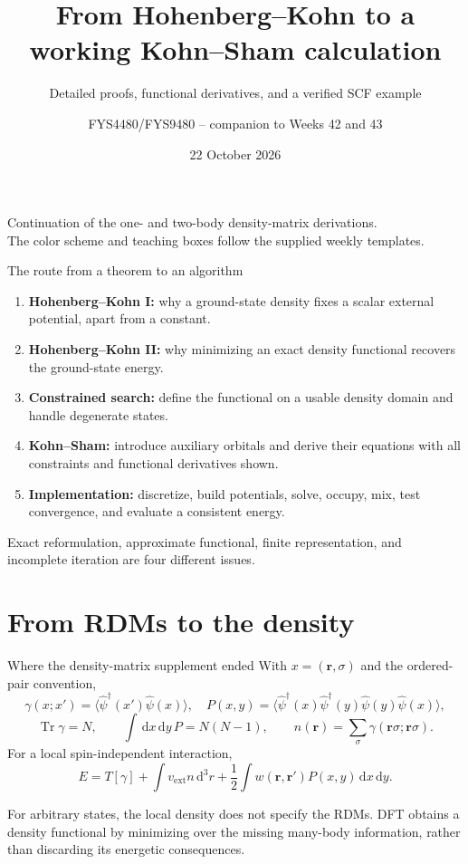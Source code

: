 \documentclass[aspectratio=169,10pt]{beamer}
\title{From Hohenberg--Kohn to a working Kohn--Sham calculation}
\subtitle{Detailed proofs, functional derivatives, and a verified SCF example}
\author{FYS4480/FYS9480 -- companion to Weeks 42 and 43}
\institute{Quantum mechanics for many-particle systems\\University of Oslo}
\date{22 October 2026}
\newcommand{\mbbox}[1]{\begin{tcolorbox}[colback=paleblue,colframe=uioblue,title={Many-body connection}]#1\end{tcolorbox}}
\newcommand{\dftbox}[1]{\begin{tcolorbox}[colback=paleteal,colframe=teal,title={Key result}]#1\end{tcolorbox}}
\newcommand{\dd}{\,\mathrm d}
\newcommand{\rr}{\mathbf r}
\newcommand{\avg}[1]{\langle #1\rangle}
\newcommand{\Tr}{\operatorname{Tr}}
\newcommand{\ext}{\mathrm{ext}}
\begin{document}
\begin{frame}[plain]
\titlepage
\begin{center}\small
Continuation of the one- and two-body density-matrix derivations.\\
The color scheme and teaching boxes follow the supplied weekly templates.
\end{center}
\end{frame}

\begin{frame}{The route from a theorem to an algorithm}
\begin{enumerate}
\item \textbf{Hohenberg--Kohn I:} why a ground-state density fixes a scalar
external potential, apart from a constant.
\item \textbf{Hohenberg--Kohn II:} why minimizing an exact density functional
recovers the ground-state energy.
\item \textbf{Constrained search:} define the functional on a usable density
domain and handle degenerate states.
\item \textbf{Kohn--Sham:} introduce auxiliary orbitals and derive their equations
with all constraints and functional derivatives shown.
\item \textbf{Implementation:} discretize, build potentials, solve, occupy,
mix, test convergence, and evaluate a consistent energy.
\end{enumerate}
\dftbox{Exact reformulation, approximate functional, finite representation,
and incomplete iteration are four different issues.}
\end{frame}

\section{From RDMs to the density}
\begin{frame}{Where the density-matrix supplement ended}
With $x=(\rr,\sigma)$ and the ordered-pair convention,
\[
 \gamma(x;x')=\avg{\hat\psi^\dagger(x')\hat\psi(x)},\quad
 P(x,y)=\avg{\hat\psi^\dagger(x)\hat\psi^\dagger(y)\hat\psi(y)\hat\psi(x)},
\]
\[
 \Tr\gamma=N,\qquad \int\dd x\dd y\,P=N(N-1),\qquad
 n(\rr)=\sum_\sigma\gamma(\rr\sigma;\rr\sigma).
\]
For a local spin-independent interaction,
\[
 E=T[\gamma]+\int v_{\ext}n\dd^3r
                         +\frac12\int w(\rr,\rr')P(x,y)\dd x\dd y.
\]
\mbbox{For arbitrary states, the local density does not specify the RDMs.
DFT obtains a density functional by minimizing over the missing many-body
information, rather than discarding its energetic consequences.}
\end{frame}
\end{document}
